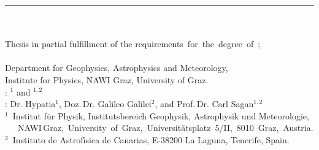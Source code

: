%

\begin{titlepage}
	\flushright
	\hfill
	\vfill
	{\color{ctgreenblue}\LARGE\thesisTitle \par}
	{\color{ctcolorgray}\large\thesisSubtitle}
	\color{ctgreenblue}\rule[5pt]{\textwidth}{1.25pt} \par
	{\color{ctgreenblue}\Large\thesisName}
	\vfill
	\textit{\large\thesisDate}
\end{titlepage}




\hfill
\vfill
{
	\small\noindent
	\physbf{\thesisName} \\
	\physit{\thesisTitle~$-$~\thesisSubtitle} \\[0.5em]
	Thesis in partial fulfillment of the \hbox{requirements for the degree of \thesisDegree}; \\
	\\[0.5em]
	Department for Geophysics, Astrophysics and Meteorology, \\ Institute for Physics, NAWI Graz, University of Graz.\\[1.5em]
: \thesisFirstSupervisor $^1$ and
\thesisSecondSupervisor $^{1,2}$\\
    : 
    Dr. Hypatia$^{1}$, Doz.\,Dr. Galileo Galilei$^{2}$, and Prof.\,Dr. Carl Sagan$^{1,2}$
 \\[1.5em]
	$^1$~Institut für Physik, Institutsbereich Geophysik, Astrophysik und Meteorologie, 
	\newline \hbox{~~~NAWI\,Graz, University of Graz, Universitätsplatz 5/II, 8010 Graz, Austria.}\\
    $^2$~Instituto de Astrof\'{\i}sica de Canarias, E-38200 La Laguna, Tenerife, Spain.\\
}